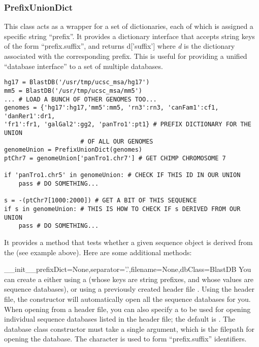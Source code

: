 \documentclass{howto}
\begin{document}
\subsubsection{PrefixUnionDict}
This class acts as a wrapper for a set of dictionaries, each
of which is assigned a specific string ``prefix''.  It provides
a dictionary interface that accepts string keys of the form
``prefix.suffix'', and returns d['suffix'] where {\em d} is
the dictionary associated with the corresponding prefix.  This
is useful for providing a unified ``database interface'' to a
set of multiple databases.
\begin{verbatim}
hg17 = BlastDB('/usr/tmp/ucsc_msa/hg17')
mm5 = BlastDB('/usr/tmp/ucsc_msa/mm5')
... # LOAD A BUNCH OF OTHER GENOMES TOO...
genomes = {'hg17':hg17,'mm5':mm5, 'rn3':rn3, 'canFam1':cf1, 'danRer1':dr1,
'fr1':fr1, 'galGal2':gg2, 'panTro1':pt1} # PREFIX DICTIONARY FOR THE UNION 
					 # OF ALL OUR GENOMES
genomeUnion = PrefixUnionDict(genomes)
ptChr7 = genomeUnion['panTro1.chr7'] # GET CHIMP CHROMOSOME 7

if 'panTro1.chr5' in genomeUnion: # CHECK IF THIS ID IN OUR UNION
    pass # DO SOMETHING...

s = -(ptChr7[1000:2000]) # GET A BIT OF THIS SEQUENCE
if s in genomeUnion: # THIS IS HOW TO CHECK IF s DERIVED FROM OUR UNION
    pass # DO SOMETHING... 
\end{verbatim}

It provides a  method that tests whether
a given sequence object is derived from the 
(see example above).  Here are some additional methods:

\begin{funcdesc}{__init__}{prefixDict=None,separator='.',filename=None,dbClass=BlastDB}
  You can create a  either using
  a  (whose keys are string prefixes, and whose 
  values are sequence databases), or using a previously created
  header file .  
  Using the header file, the constructor will
  automatically open all the sequence databases for you.
  When opening from a header file, you can also specify a
   to be used for opening individual sequence databases
  listed in the header file; the default is .
  The database class constructor must take a single argument,
  which is the filepath for opening the database.  The 
   character is used to form ``prefix.suffix''
  identifiers.
\end{funcdesc}
\end{document}
